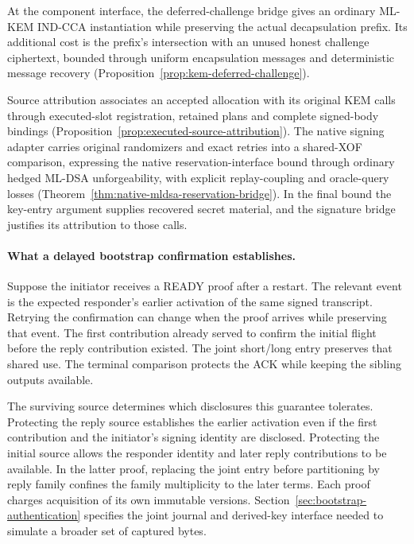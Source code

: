 \documentclass[pdflatex]{sn-jnl}
\theoremstyle{thmstyleone}
\theoremstyle{thmstylethree}
\theoremstyle{thmstyletwo}
\begin{document}
At the component interface, the deferred-challenge bridge gives an
ordinary ML-KEM IND-CCA instantiation while preserving the actual
decapsulation prefix. Its additional cost is the prefix's intersection
with an unused honest challenge ciphertext, bounded through uniform
encapsulation messages and deterministic message recovery
(Proposition~\ref{prop:kem-deferred-challenge}).

Source attribution associates an accepted allocation with its original
KEM calls through executed-slot registration, retained plans and complete
signed-body bindings
(Proposition~\ref{prop:executed-source-attribution}). The native signing
adapter carries original randomizers and exact retries into a shared-XOF
comparison, expressing the native reservation-interface bound through
ordinary hedged ML-DSA unforgeability, with explicit replay-coupling and
oracle-query losses
(Theorem~\ref{thm:native-mldsa-reservation-bridge}). In the final bound the
key-entry argument supplies recovered secret material, and the
signature bridge justifies its attribution to those calls.

\paragraph{What a delayed bootstrap confirmation establishes.}
Suppose the initiator receives a READY proof after a restart. The
relevant event is the expected responder's earlier activation of the
same signed transcript. Retrying the confirmation can change when
the proof arrives while preserving that event. The first contribution
already served to confirm the initial flight before the reply
contribution existed. The joint short/long entry preserves that shared
use. The terminal comparison protects the ACK while keeping the
sibling outputs available.

The surviving source determines which disclosures this guarantee
tolerates. Protecting the reply source establishes the earlier
activation even if the first contribution and the initiator's signing
identity are disclosed. Protecting the initial source allows the
responder identity and later reply contributions to be available.
In the latter proof, replacing the joint entry before partitioning by
reply family confines the family multiplicity to the later terms.
Each proof charges acquisition of its own immutable versions.
Section~\ref{sec:bootstrap-authentication} specifies the joint journal
and derived-key interface needed to simulate a broader set of captured
bytes.
\end{document}
